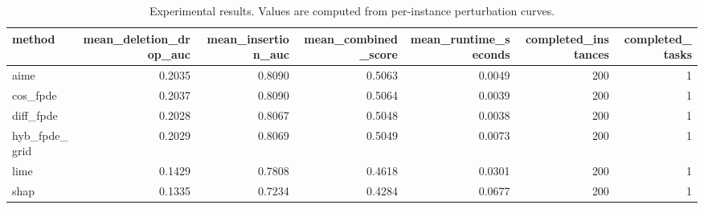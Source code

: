 \begin{table}[t]
\caption{Experimental results. Values are computed from per-instance perturbation curves.}
\label{tab:main_results_computed}
\centering
\begin{tabular}{lrrrrrr}
\toprule
method & mean\_deletion\_drop\_auc & mean\_insertion\_auc & mean\_combined\_score & mean\_runtime\_seconds & completed\_instances & completed\_tasks \\
\midrule
aime & 0.2035 & 0.8090 & 0.5063 & 0.0049 & 200 & 1 \\
cos\_fpde & 0.2037 & 0.8090 & 0.5064 & 0.0039 & 200 & 1 \\
diff\_fpde & 0.2028 & 0.8067 & 0.5048 & 0.0038 & 200 & 1 \\
hyb\_fpde\_grid & 0.2029 & 0.8069 & 0.5049 & 0.0073 & 200 & 1 \\
lime & 0.1429 & 0.7808 & 0.4618 & 0.0301 & 200 & 1 \\
shap & 0.1335 & 0.7234 & 0.4284 & 0.0677 & 200 & 1 \\
\bottomrule
\end{tabular}

\end{table}
